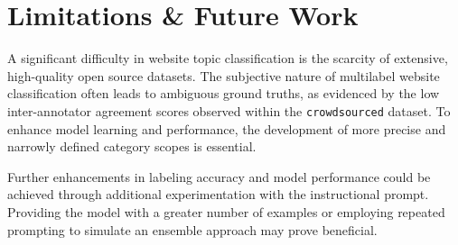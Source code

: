 \section{Limitations \& Future Work}
\label{sec:limitations}

A significant difficulty in website topic classification is the scarcity of extensive, high-quality open source datasets. The subjective nature of multilabel website classification often leads to ambiguous ground truths, as evidenced by the low inter-annotator agreement scores observed within the \texttt{crowdsourced} dataset. To enhance model learning and performance, the development of more precise and narrowly defined category scopes is essential.

Further enhancements in labeling accuracy and model performance could be achieved through additional experimentation with the instructional prompt. 
Providing the model with a greater number of examples or employing repeated prompting to simulate an ensemble approach may prove beneficial.